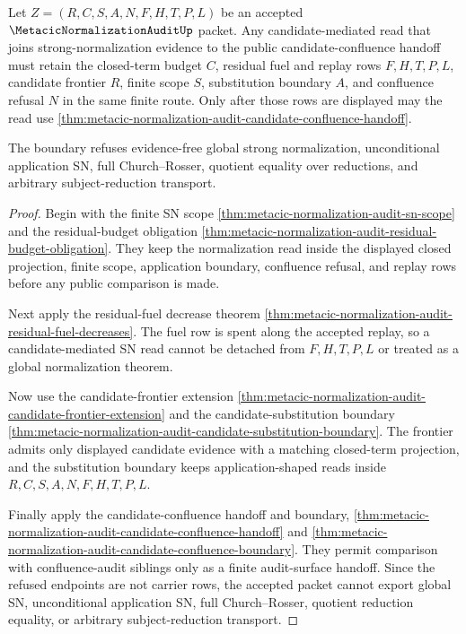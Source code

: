 \begin{theorem}
\label{thm:metacic-normalization-audit-candidate-mediated-sn-confluence}
Let $Z=(R,C,S,A,N,F,H,T,P,L)$ be an accepted
$\MetacicNormalizationAuditUp$ packet. Any candidate-mediated read that joins
strong-normalization evidence to the public candidate-confluence handoff must
retain the closed-term budget $C$, residual fuel and replay rows $F,H,T,P,L$,
candidate frontier $R$, finite scope $S$, substitution boundary $A$, and
confluence refusal $N$ in the same finite route. Only after those rows are
displayed may the read use
\autoref{thm:metacic-normalization-audit-candidate-confluence-handoff}.

The boundary refuses evidence-free global strong normalization, unconditional
application SN, full Church--Rosser, quotient equality over reductions, and
arbitrary subject-reduction transport.
\end{theorem}
\begin{proof}
Begin with the finite SN scope
\autoref{thm:metacic-normalization-audit-sn-scope} and the residual-budget
obligation \autoref{thm:metacic-normalization-audit-residual-budget-obligation}.
They keep the normalization read inside the displayed closed projection,
finite scope, application boundary, confluence refusal, and replay rows before
any public comparison is made.

Next apply the residual-fuel decrease theorem
\autoref{thm:metacic-normalization-audit-residual-fuel-decreases}. The fuel row
is spent along the accepted replay, so a candidate-mediated SN read cannot be
detached from $F,H,T,P,L$ or treated as a global normalization theorem.

Now use the candidate-frontier extension
\autoref{thm:metacic-normalization-audit-candidate-frontier-extension} and the
candidate-substitution boundary
\autoref{thm:metacic-normalization-audit-candidate-substitution-boundary}. The
frontier admits only displayed candidate evidence with a matching closed-term
projection, and the substitution boundary keeps application-shaped reads
inside $R,C,S,A,N,F,H,T,P,L$.

Finally apply the candidate-confluence handoff and boundary,
\autoref{thm:metacic-normalization-audit-candidate-confluence-handoff} and
\autoref{thm:metacic-normalization-audit-candidate-confluence-boundary}. They
permit comparison with confluence-audit siblings only as a finite audit-surface
handoff. Since the refused endpoints are not carrier rows, the accepted packet
cannot export global SN, unconditional application SN, full Church--Rosser,
quotient reduction equality, or arbitrary subject-reduction transport.
\end{proof}

